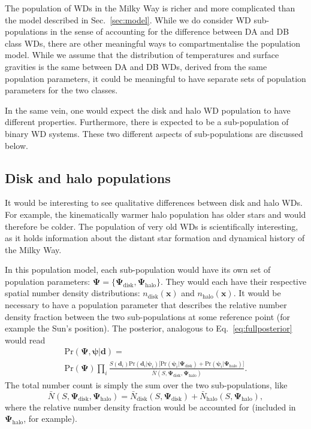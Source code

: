 \documentclass[fleqn,usenatbib]{mnras}
\newcommand{\popp}{\boldsymbol{\Psi}}
\newcommand{\objp}{\boldsymbol{\psi}}
\newcommand{\data}{\mathbf{d}}
\newcommand{\pr}{\text{Pr}}
\begin{document}
The population of WDs in the Milky Way is richer and more complicated than the model described in Sec.~\ref{sec:model}. While we do consider WD sub-populations in the sense of accounting for the difference between DA and DB class WDs, there are other meaningful ways to compartmentalise the population model. While we assume that the distribution of temperatures and surface gravities is the same between DA and DB WDs, derived from the same population parameters, it could be meaningful to have separate sets of population parameters for the two classes.

In the same vein, one would expect the disk and halo WD population to have different properties. Furthermore, there is expected to be a sub-population of binary WD systems. These two different aspects of sub-populations are discussed below.



\subsection{Disk and halo populations}

It would be interesting to see qualitative differences between disk and halo WDs. For example, the kinematically warmer halo population has older stars and would therefore be colder. The population of very old WDs is scientifically interesting, as it holds information about the distant star formation and dynamical history of the Milky Way.

In this population model, each sub-population would have its own set of population parameters: $\popp = \{ \popp_\text{disk},\popp_\text{halo} \}$. They would each have their respective spatial number density distributions: $n_\text{disk}(\mathbf{x})$ and $n_\text{halo}(\mathbf{x})$. It would be necessary to have a population parameter that describes the relative number density fraction between the two sub-populations at some reference point (for example the Sun's position). The posterior, analogous to Eq.~\eqref{eq:fullposterior} would read
\begin{equation}\label{eq:posterior_disk_halo}
\begin{split}
	\pr(\popp,\objp | \data ) = \\ \pr(\popp)
	\prod_i \frac{S(\data_i) \pr(\data_i | \objp_i) \Big[ \pr(\objp_i | \popp_\text{disk})+\pr(\objp_i | \popp_\text{halo}) \Big]}{\bar{N}(S,\popp_\text{disk},\popp_\text{halo})}.
\end{split}
\end{equation}
The total number count is simply the sum over the two sub-populations, like
\begin{equation}
	\bar{N}(S,\popp_\text{disk},\popp_\text{halo})=\bar{N}_\text{disk}(S,\popp_\text{disk})+\bar{N}_\text{halo}(S,\popp_\text{halo}),
\end{equation}
where the relative number density fraction would be accounted for (included in $\popp_\text{halo}$, for example).
\end{document}
